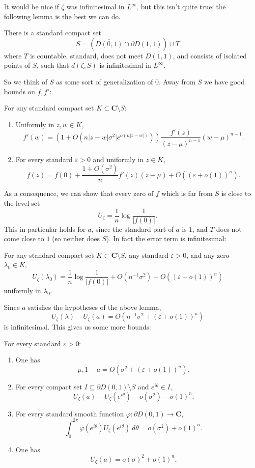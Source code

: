 \documentclass[12pt]{article}
\begin{document}
It would be nice if $\zeta$ was infinitesimal in $L^\infty$, but this isn't quite true; the following lemma is the best we can do.
\begin{lemma}
There is a standard compact set
$$S = (\overline{D(0, 1)} \cap \partial D(1, 1)) \cup T$$
where $T$ is countable, standard, does not meet $\overline{D(1, 1)}$, and consists of isolated points of $S$, such that $d(\zeta, S)$ is infinitesimal in $L^\infty$.
\end{lemma}
So we think of $S$ as some sort of generalization of $0$.
Away from $S$ we have good bounds on $f,f'$:
\begin{lemma}
For any standard compact set $K \subset \mathbf C \setminus S$:
\begin{enumerate}
\item Uniformly in $z, w \in K$,
$$f'(w) = (1 + O(n|z - w|\sigma^2|e^{o(n|z -w|)})) \frac{f'(z)}{(z - \mu)^{n-1}} (w - \mu)^{n-1}.$$
\item For every standard $\varepsilon > 0$ and uniformly in $z \in K$,
$$f(z) = f(0) + \frac{1 + O(\sigma^2)}{n} f'(z) (z - \mu) + O((\varepsilon + o(1))^n).$$
\end{enumerate}
\end{lemma}
As a consequence, we can show that every zero of $f$ which is far from $S$ is close to the level set
$$U_\zeta = \frac{1}{n} \log\frac{1}{|f(0)|}.$$
This in particular holds for $a$, since the standard part of $a$ is $1$, and $T$ does not come close to $1$ (so neither does $S$).
In fact the error term is infinitesimal:
\begin{lemma}
For any standard compact set $K \subset \mathbf C \setminus S$, any standard $\varepsilon > 0$, and any zero $\lambda_0 \in K$,
$$U_\zeta(\lambda_0) = \frac{1}{n} \log \frac{1}{|f(0)|} + O(n^{-1}\sigma^2) + O((\varepsilon + o(1))^n)$$
uniformly in $\lambda_0$.
\end{lemma}
Since $a$ satisfies the hypotheses of the above lemma,
$$U_\zeta(\lambda) - U_\zeta(a) = O(n^{-1}\sigma^2 + (\varepsilon + o(1))^n)$$
is infinitesimal.
This gives us some more bounds:
\begin{lemma}
For every standard $\varepsilon > 0$:
\begin{enumerate}
\item One has
$$\mu, 1 - a = O(\sigma^2 + (\varepsilon + o(1))^n).$$
\item For every compact set $I \subseteq \partial D(0, 1) \setminus S$ and $e^{i\theta} \in I$,
$$U_\zeta(a) - U_\zeta(e^{i\theta}) -o(\sigma^2) - o(1)^n.$$
\item For every standard smooth function $\varphi: \partial D(0, 1) \to \mathbf C$,
$$\int_0^{2\pi} \varphi(e^{i\theta}) U_\zeta(e^{i\theta}) ~d\theta = o(\sigma^2) + o(1)^n.$$
\item One has
$$U_\zeta(a) = o(\sigma)^2 + o(1)^n.$$
\end{enumerate}
\end{lemma}
\end{document}
